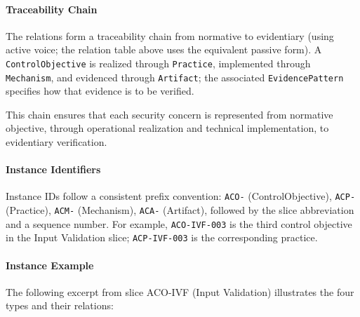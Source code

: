 \documentclass[
]{article}
\begin{document}
\paragraph{Traceability Chain}\label{traceability-chain}

The relations form a traceability chain from normative to evidentiary
(using active voice; the relation table above uses the equivalent
passive form). A \texttt{ControlObjective} is realized through
\texttt{Practice}, implemented through \texttt{Mechanism}, and evidenced
through \texttt{Artifact}; the associated \texttt{EvidencePattern}
specifies how that evidence is to be verified.

This chain ensures that each security concern is represented from
normative objective, through operational realization and technical
implementation, to evidentiary verification.

\paragraph{Instance Identifiers}\label{instance-identifiers}

Instance IDs follow a consistent prefix convention: \texttt{ACO-}
(ControlObjective), \texttt{ACP-} (Practice), \texttt{ACM-} (Mechanism),
\texttt{ACA-} (Artifact), followed by the slice abbreviation and a
sequence number. For example, \texttt{ACO-IVF-003} is the third control
objective in the Input Validation slice; \texttt{ACP-IVF-003} is the
corresponding practice.

\paragraph{Instance Example}\label{instance-example}

The following excerpt from slice ACO-IVF (Input Validation) illustrates
the four types and their relations:
\end{document}
